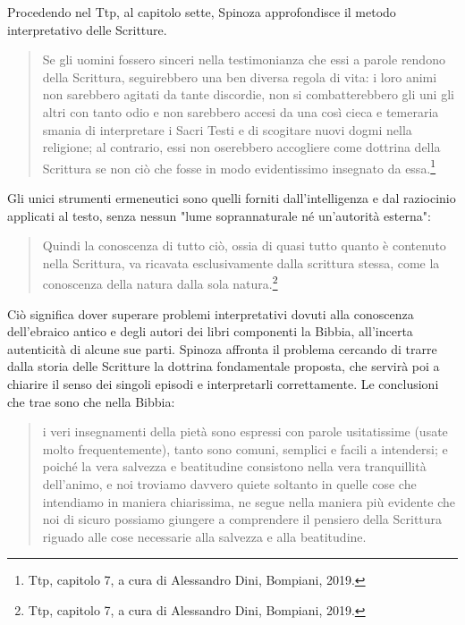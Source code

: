 Procedendo nel Ttp, al capitolo sette, Spinoza approfondisce il metodo interpretativo delle Scritture. 

\begin{quotation}
	\small Se gli uomini fossero sinceri nella testimonianza che essi a parole rendono della
	Scrittura, seguirebbero una ben diversa regola di vita: i loro animi non sarebbero
	agitati da tante discordie, non si combatterebbero gli uni gli altri con tanto odio
	e non sarebbero accesi da una così cieca e temeraria smania di interpretare i Sacri
	Testi e di scogitare nuovi dogmi nella religione; al contrario, essi non oserebbero
	accogliere come dottrina della Scrittura se non ciò che fosse in modo evidentissimo
	insegnato da essa.\footnote{Ttp, capitolo 7, a cura di Alessandro Dini, Bompiani, 2019.}
\end{quotation}

Gli unici strumenti ermeneutici sono quelli forniti dall'intelligenza e dal raziocinio applicati al testo, senza nessun "lume soprannaturale né un’autorità esterna":

\begin{quotation}
	\small Quindi la conoscenza di
	tutto ciò, ossia di quasi tutto quanto è contenuto nella Scrittura, va ricavata
	esclusivamente dalla scrittura stessa, come la conoscenza della natura dalla sola
	natura.\footnote{Ttp, capitolo 7, a cura di Alessandro Dini, Bompiani, 2019.}
\end{quotation}

Ciò significa dover superare problemi interpretativi dovuti alla conoscenza dell'ebraico antico e degli autori dei libri componenti la Bibbia, all'incerta autenticità di alcune sue parti. Spinoza affronta il problema cercando di trarre dalla storia delle Scritture la dottrina fondamentale proposta, che servirà poi a chiarire il senso dei singoli episodi e interpretarli correttamente. Le conclusioni che trae sono che nella Bibbia:

\begin{quotation}
	\small i veri insegnamenti della pietà sono espressi con parole usitatissime (usate molto frequentemente), tanto sono comuni, semplici e facili a intendersi; e poiché la vera salvezza e beatitudine consistono nella vera tranquillità dell'animo, e noi troviamo davvero quiete soltanto in quelle cose che intendiamo in maniera chiarissima, ne segue nella maniera più evidente che noi di sicuro possiamo giungere a comprendere il pensiero della Scrittura riguado alle cose necessarie alla salvezza e alla beatitudine.
\end{quotation}

